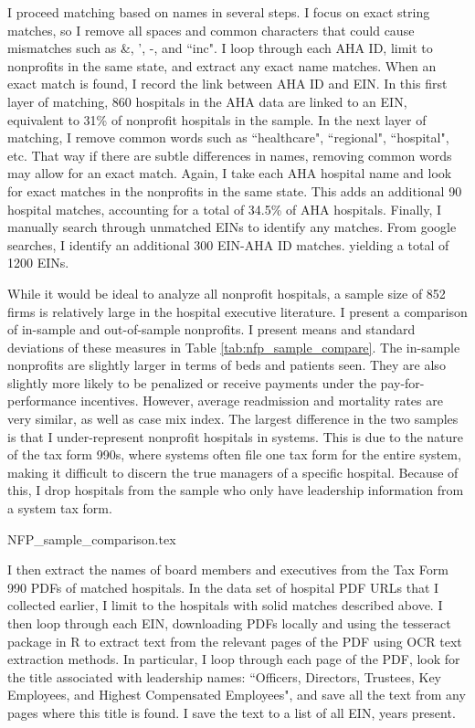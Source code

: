 \documentclass[12pt]{article}
\begin{document}
I proceed matching based on names in several steps. I focus on exact string matches, so I remove all spaces and common characters that could cause mismatches such as \&, ', -, and ``inc". I loop through each AHA ID, limit to nonprofits in the same state, and extract any exact name matches. When an exact match is found, I record the link between AHA ID and EIN. In this first layer of matching, 860 hospitals in the AHA data are linked to an EIN, equivalent to 31\% of nonprofit hospitals in the sample. In the next layer of matching, I remove common words such as ``healthcare", ``regional", ``hospital", etc. That way if there are subtle differences in names, removing common words may allow for an exact match. Again, I take each AHA hospital name and look for exact matches in the nonprofits in the same state. This adds an additional 90 hospital matches, accounting for a total of 34.5\% of AHA hospitals. Finally, I manually search through unmatched EINs to identify any matches. From google searches, I identify an additional 300 EIN-AHA ID matches. yielding a total of 1200 EINs. 

While it would be ideal to analyze all nonprofit hospitals, a sample size of 852 firms is relatively large in the hospital executive literature. I present a comparison of in-sample and out-of-sample nonprofits. I present means and standard deviations of these measures in Table \ref{tab:nfp_sample_compare}. The in-sample nonprofits are slightly larger in terms of beds and patients seen. They are also slightly more likely to be penalized or receive payments under the pay-for-performance incentives. However, average readmission and mortality rates are very similar, as well as case mix index. The largest difference in the two samples is that I under-represent nonprofit hospitals in systems. This is due to the nature of the tax form 990s, where systems often file one tax form for the entire system, making it difficult to discern the true managers of a specific hospital. Because of this, I drop hospitals from the sample who only have leadership information from a system tax form. 

{NFP_sample_comparison.tex}

I then extract the names of board members and executives from the Tax Form 990 PDFs of matched hospitals. In the data set of hospital PDF URLs that I collected earlier, I limit to the hospitals with solid matches described above. I then loop through each EIN, downloading PDFs locally and using the tesseract package in R to extract text from the relevant pages of the PDF using OCR text extraction methods. In particular, I loop through each page of the PDF, look for the title associated with leadership names: ``Officers, Directors, Trustees, Key Employees, and Highest Compensated Employees", and save all the text from any pages where this title is found. I save the text to a list of all EIN, years present. 
\end{document}
